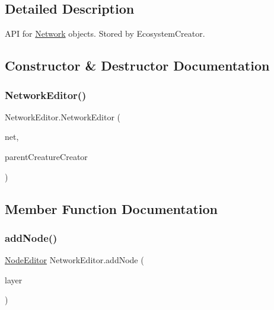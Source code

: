 \subsection{Detailed Description}
A\+PI for \mbox{\hyperlink{class_network}{Network}} objects. Stored by Ecosystem\+Creator. 



\subsection{Constructor \& Destructor Documentation}
\mbox{\label{class_network_editor_a8e9b3df4a6b328ee2d42318a82160faa}} 
\subsubsection{\texorpdfstring{Network\+Editor()}{NetworkEditor()}}
{\footnotesize\ttfamily Network\+Editor.\+Network\+Editor (\begin{DoxyParamCaption}\item[{\mbox{\hyperlink{class_network}{Network}}}]{net,  }\item[{\mbox{\hyperlink{class_creature_editor}{Creature\+Editor}}}]{parent\+Creature\+Creator }\end{DoxyParamCaption})}



\subsection{Member Function Documentation}
\mbox{\label{class_network_editor_a3958da3c1d8c016ba28e6ffc44a7e35f}} 
\subsubsection{\texorpdfstring{add\+Node()}{addNode()}}
{\footnotesize\ttfamily \mbox{\hyperlink{class_node_editor}{Node\+Editor}} Network\+Editor.\+add\+Node (\begin{DoxyParamCaption}\item[{int}]{layer }\end{DoxyParamCaption})}

